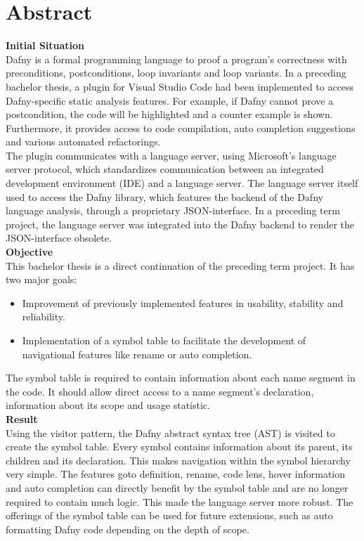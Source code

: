 \section{Abstract}
\label{section:abstract}

\textbf{Initial Situation}\\
Dafny is a formal programming language to proof a program's correctness with preconditions, postconditions, loop invariants and loop variants.
In a preceding bachelor thesis, a plugin for Visual Studio Code had been implemented to access Dafny-specific static analysis features.
For example, if Dafny cannot prove a postcondition, the code will be highlighted and a counter example is shown.
Furthermore, it provides access to code compilation, auto completion suggestions and various automated refactorings.\\

The plugin communicates with a language server, using Microsoft's language server protocol, which standardizes communication between an integrated development environment (IDE) and a language server. 
The language server itself used to access the Dafny library, which features the backend of the Dafny language analysis, through a proprietary JSON-interface.
In a preceding term project, the language server was integrated into the Dafny backend to render the JSON-interface obsolete.\\

\textbf{Objective}\\
This bachelor thesis is a direct continuation of the preceding term project.
It has two major goals:
\begin{itemize}
    \item Improvement of previously implemented features in usability, stability and reliability.
    \item Implementation of a symbol table to facilitate the development of navigational features like rename or auto completion.
\end{itemize}
The symbol table is required to contain information about each name segment in the code.
It should allow direct access to a name segment's declaration, information about its scope and usage statistic.\\

\textbf{Result}\\
Using the visitor pattern, the Dafny abstract syntax tree (AST) is visited to create the symbol table.
Every symbol contains information about its parent, its children and its declaration.
This makes navigation within the symbol hierarchy  very simple.
The features goto definition, rename, code lens, hover information and auto completion can directly benefit by the symbol table and are no longer required to contain much logic.
This made the language server more robust.
The offerings of the symbol table can be used for future extensions, such as auto formatting Dafny code depending on the depth of scope.\\


